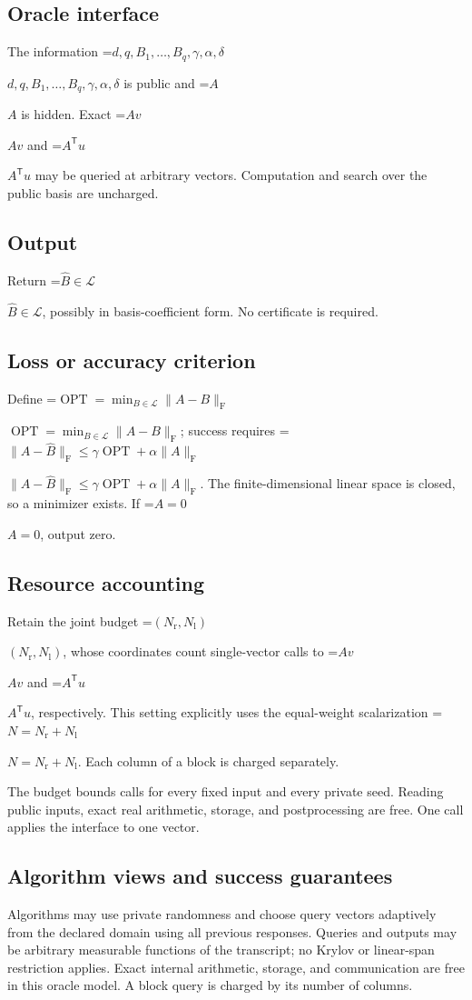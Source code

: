 \documentclass[10pt,a4paper]{article}
\newcommand{\AtlasMath}[1]{\par\begingroup\centering\setbox0=\hbox{$\displaystyle #1$}\ifdim\wd0>1.4\linewidth\typeout{ATLAS WIDE FORMULA: \the\wd0}\fi\ifdim\wd0>\linewidth\resizebox{\linewidth}{!}{\box0}\else\box0\fi\par\endgroup}
\newcommand{\AtlasInlineMath}[1]{\begingroup\setbox0=\hbox{$#1$}\ifdim\wd0>.4\linewidth\endgroup\AtlasMath{#1}\else\endgroup$#1$\fi}
\begin{document}
\subsection{Oracle interface}
The information \AtlasInlineMath{d,q,B_1,\ldots,B_q,\gamma,\alpha,\delta} is public and \AtlasInlineMath{A} is hidden. Exact \AtlasInlineMath{Av} and \AtlasInlineMath{A^{\mathsf T}u} may be queried at arbitrary vectors. Computation and search over the public basis are uncharged.

\subsection{Output}
Return \AtlasInlineMath{\widehat{B}\in\mathcal{L}}, possibly in basis-coefficient form. No certificate is required.

\subsection{Loss or accuracy criterion}
Define \AtlasInlineMath{\operatorname{OPT}=\min_{B\in\mathcal{L}}\|A-B\|_{\mathrm{F}}}; success requires \AtlasInlineMath{\|A-\widehat{B}\|_{\mathrm{F}}\le\gamma\operatorname{OPT}+\alpha\|A\|_{\mathrm{F}}}. The finite-dimensional linear space is closed, so a minimizer exists. If \AtlasInlineMath{A=0}, output zero.

\subsection{Resource accounting}
Retain the joint budget \AtlasInlineMath{(N_{\mathrm{r}},N_{\mathrm{l}})}, whose coordinates count single-vector calls to \AtlasInlineMath{Av} and \AtlasInlineMath{A^{\mathsf T}u}, respectively. This setting explicitly uses the equal-weight scalarization \AtlasInlineMath{N=N_{\mathrm{r}}+N_{\mathrm{l}}}. Each column of a block is charged separately.

The budget bounds calls for every fixed input and every private seed. Reading public inputs, exact real arithmetic, storage, and postprocessing are free. One call applies the interface to one vector.

\subsection{Algorithm views and success guarantees}
Algorithms may use private randomness and choose query vectors adaptively from the declared domain using all previous responses. Queries and outputs may be arbitrary measurable functions of the transcript; no Krylov or linear-span restriction applies. Exact internal arithmetic, storage, and communication are free in this oracle model. A block query is charged by its number of columns.
\end{document}
